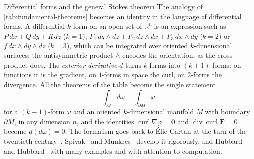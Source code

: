 \begin{table}
\end{table}

\begin{note}{Differential forms and the general Stokes theorem}
The analogy of \cref{tab:fundamental-theorems} becomes an identity in the language of differential forms. A differential $k$-form on an open set of $\mathbb R^n$ is an expression such as $P\,dx+Q\,dy+R\,dz$ ($k=1$), $F_1\,dy\wedge dz+F_2\,dz\wedge dx+F_3\,dx\wedge dy$ ($k=2$) or $f\,dx\wedge dy\wedge dz$ ($k=3$), which can be integrated over oriented $k$-dimensional surfaces; the antisymmetric product $\wedge$ encodes the orientation, as the cross product does. The \emph{exterior derivative} $d$ turns $k$-forms into $(k+1)$-forms: on functions it is the gradient, on $1$-forms in space the curl, on $2$-forms the divergence. All the theorems of the table become the single statement
\[
\int_Md\omega=\int_{\partial M}\omega
\]
for a $(k-1)$-form $\omega$ and an oriented $k$-dimensional manifold $M$ with boundary $\partial M$, in any dimension $n$, and the identities $\operatorname{curl}\nabla\varphi=\mathbf0$ and $\operatorname{div}\operatorname{curl}\mathbf F=0$ become $d(d\omega)=0$. The formalism goes back to \'Elie Cartan at the turn of the twentieth century~\cite{katz1979}. Spivak~\cite{spivak1965manifolds} and Munkres~\cite{munkres1991} develop it rigorously, and Hubbard and Hubbard~\cite{hubbard2015vector} with many examples and with attention to computation.
\end{note}


